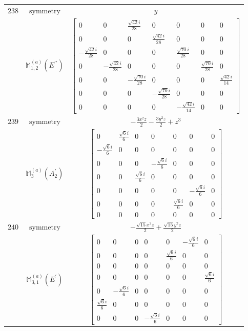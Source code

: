 \documentclass[fleqn,8pt,landscape]{jsarticle}
\begin{document}
\begin{longtable}{ccc}
$ 238 $ & $ \text{symmetry} $ & $ y $ \\
$  $ & $ \mathbb{M}_{1,2}^{(a)}(E^{\prime\prime}) $ & $ \begin{bmatrix} 0 & 0 & \frac{\sqrt{42} i}{28} & 0 & 0 & 0 & 0 \\ 0 & 0 & 0 & \frac{\sqrt{42} i}{28} & 0 & 0 & 0 \\ - \frac{\sqrt{42} i}{28} & 0 & 0 & 0 & \frac{\sqrt{70} i}{28} & 0 & 0 \\ 0 & - \frac{\sqrt{42} i}{28} & 0 & 0 & 0 & \frac{\sqrt{70} i}{28} & 0 \\ 0 & 0 & - \frac{\sqrt{70} i}{28} & 0 & 0 & 0 & \frac{\sqrt{42} i}{14} \\ 0 & 0 & 0 & - \frac{\sqrt{70} i}{28} & 0 & 0 & 0 \\ 0 & 0 & 0 & 0 & - \frac{\sqrt{42} i}{14} & 0 & 0 \end{bmatrix} $ \\ \hline
$ 239 $ & $ \text{symmetry} $ & $ - \frac{3 x^{2} z}{2} - \frac{3 y^{2} z}{2} + z^{3} $ \\
$  $ & $ \mathbb{M}_{3}^{(a)}(A_{2}^{\prime}) $ & $ \begin{bmatrix} 0 & \frac{\sqrt{6} i}{6} & 0 & 0 & 0 & 0 & 0 \\ - \frac{\sqrt{6} i}{6} & 0 & 0 & 0 & 0 & 0 & 0 \\ 0 & 0 & 0 & - \frac{\sqrt{6} i}{6} & 0 & 0 & 0 \\ 0 & 0 & \frac{\sqrt{6} i}{6} & 0 & 0 & 0 & 0 \\ 0 & 0 & 0 & 0 & 0 & - \frac{\sqrt{6} i}{6} & 0 \\ 0 & 0 & 0 & 0 & \frac{\sqrt{6} i}{6} & 0 & 0 \\ 0 & 0 & 0 & 0 & 0 & 0 & 0 \end{bmatrix} $ \\ \hline
$ 240 $ & $ \text{symmetry} $ & $ - \frac{\sqrt{15} x^{2} z}{2} + \frac{\sqrt{15} y^{2} z}{2} $ \\
$  $ & $ \mathbb{M}_{3,1}^{(a)}(E^{\prime}) $ & $ \begin{bmatrix} 0 & 0 & 0 & 0 & 0 & - \frac{\sqrt{6} i}{6} & 0 \\ 0 & 0 & 0 & 0 & \frac{\sqrt{6} i}{6} & 0 & 0 \\ 0 & 0 & 0 & 0 & 0 & 0 & 0 \\ 0 & 0 & 0 & 0 & 0 & 0 & \frac{\sqrt{6} i}{6} \\ 0 & - \frac{\sqrt{6} i}{6} & 0 & 0 & 0 & 0 & 0 \\ \frac{\sqrt{6} i}{6} & 0 & 0 & 0 & 0 & 0 & 0 \\ 0 & 0 & 0 & - \frac{\sqrt{6} i}{6} & 0 & 0 & 0 \end{bmatrix} $ \\ \hline

\end{longtable}
\end{document}
